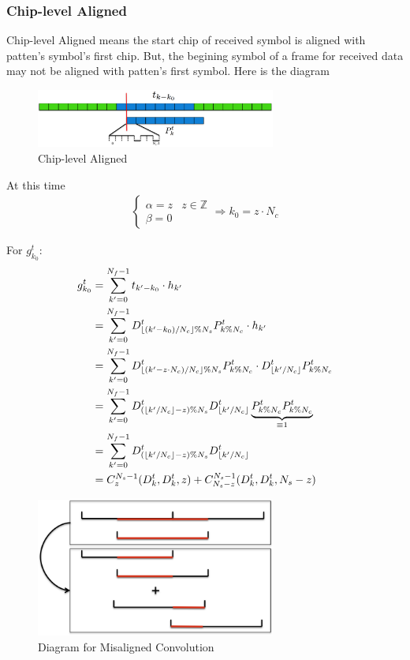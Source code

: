 \documentclass[a4paper]{article}
\begin{document}
\subsubsection{Chip-level Aligned} %
\label{ssub:chip_level_aligned}
Chip-level Aligned means the start chip of received symbol is aligned with patten's symbol's first chip. But, the begining symbol of a frame for received data may not be aligned with patten's first symbol. Here is the diagram
\begin{figure}[ht]
	\centering
	\includegraphics[width = 3.1in]{figure/chip_level_aligned.png}
	\caption{Chip-level Aligned}
	\label{fig:Chip-level aligned}
\end{figure}

At this time
\begin{align}
	\begin{cases}
		\alpha = z &z \in \mathbb{Z}\\
		\beta = 0 &
	\end{cases}
	\Rightarrow k_0 = z \cdot N_c
\end{align}

For $g^t_{k_0}$:
\begin{align}
	g^t_{k_0}
	&= \sum_{k' = 0}^{N_f-1} t_{k'-k_0} \cdot h_{k'}\\
	&= \sum_{k' = 0}^{N_f-1} D^t_{\lfloor(k'-k_0) / N_c\rfloor\%N_s} P^t_{k \% N_c} \cdot h_{k'}\\
	&= \sum_{k' = 0}^{N_f-1} D^t_{\lfloor(k'-z \cdot N_c) / N_c\rfloor\%N_s} P^t_{k \% N_c} \cdot D^t_{\lfloor k'/N_c\rfloor} P^t_{k \% N_c}\\
	&= \sum_{k' = 0}^{N_f-1} D^t_{(\lfloor k' / N_c\rfloor - z)\%N_s} D^t_{\lfloor k'/N_c\rfloor} \underbrace{P^t_{k \% N_c} P^t_{k \% N_c}}_{\equiv 1}\\
	&= \sum_{k' = 0}^{N_f-1} D^t_{(\lfloor k' / N_c\rfloor - z)\%N_s} D^t_{\lfloor k'/N_c\rfloor}\\
	&= C_z^{N_s-1}(D_k^t, D_k^t, z) + C_{N_s - z}^{N_s-1}(D_k^t, D_k^t, N_s - z)
\end{align}
\begin{figure}[ht]
	\centering
	\includegraphics[width=3.1in]{figure/misaligned_conv.png}
	\caption{Diagram for Misaligned Convolution}
	\label{fig:Diagram for Misaligned Convolution}
\end{figure}
\end{document}
